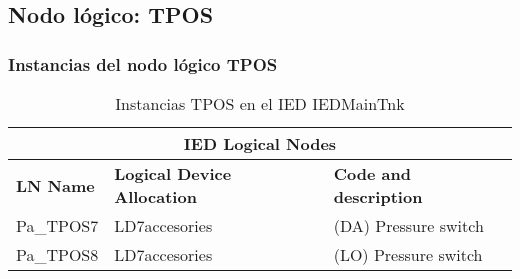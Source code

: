 
\subsection{Nodo l\'ogico: 			 TPOS}

    \subsubsection{Instancias del nodo l\'ogico TPOS}
    \begin{table}[H]
    \begin{center}
    \begin{tabular}{|l|l|p{6.8cm}|}
            \hline
            \multicolumn{3}{|c|}{\cellcolor[gray]{0.8} \textbf{IED Logical Nodes} } \\
            \hline
            \textbf{LN Name} & \textbf{Logical Device Allocation} & \textbf{Code and description} \\
            \hline
            Pa\_TPOS7 & LD7accesories & (DA) Pressure switch \\
            \hline
            Pa\_TPOS8 & LD7accesories & (LO) Pressure switch \\
            \hline
    \end{tabular}
    \caption{Instancias TPOS en el IED IEDMainTnk}
    \label{table:lnInstTPOS_prs_sw}
    \end{center}
    \end{table}
    
    
    
